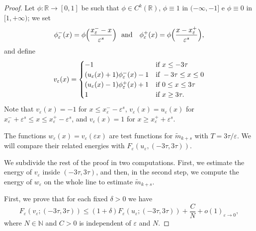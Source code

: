 \documentclass{article}
\newcommand{\e}{\varepsilon}
\begin{document}
\begin{proof}
Let $\phi\colon\mathbb R\to[0,1]$ be such that $\phi\in C^k(\mathbb R)$, $\phi\equiv 1$ in $(-\infty,-1]$ e $\phi\equiv 0$ in $[1,+\infty)$; we set  
\[\phi^-_\e(x)=\phi\Big(\displaystyle\frac{x_\e^{-}-x}{\e^s}\Big) \ \ \hbox{\rm and } \ \  \phi^+_\e(x)=\phi\Big(\displaystyle\frac{x-x_\e^{+}}{\e^s}\Big), 
\]
and define 
$$v_\e(x)=\begin{cases} 
-1 & \hbox{\rm if } x\leq -3\tau\\
(u_\e(x)+1)\phi_\e^-(x)-1 & \hbox{\rm if } -3\tau\leq x\leq 0\\
(u_\e(x)-1)\phi_\e^+(x)+1 & \hbox{\rm if } 0\leq x\leq 3\tau\\
1 & \hbox{\rm if } x\geq 3\tau. 
\end{cases}$$  
Note that $v_\e(x)= -1$ for $x\le x_\e^--\e^s$, $v_\e(x)=u_\e(x)$ for $x_\e^-+\e^s\le x\le x_\e^+-\e^s$, and $v_\e(x)= 1$ for $x\ge x_\e^++\e^s$.

The functions $w_\e(x)=v_\e(\e x)$ are test functions for $\widetilde m_{k+s}$ with $T=3\tau/\e$. We will 
compare their related energies with $F_\e(u_\e,(-3\tau, 3\tau))$. 
\smallskip

We subdivide the rest of the proof in two computations. First, we estimate the energy of $v_\e$ inside $(-3\tau, 3\tau)$, and then, in the second step, we compute the energy of $w_\e$ on the whole line to estimate $\widetilde m_{k+s}$. 

\medskip
{} 
First, we prove that for each fixed $\delta>0$ we have 
\begin{equation}\label{step1}
F_\e(v_\e;(-3\tau,3\tau))\leq (1+\delta)F_\e(u_\e; (-3\tau, 3\tau))+\frac{C}{N}+o(1)_{\e\to 0},   
\end{equation}
where $N\in\mathbb N$ and $C>0$ is independent of $\e$ and $N$. 


\end{proof}
\end{document}
